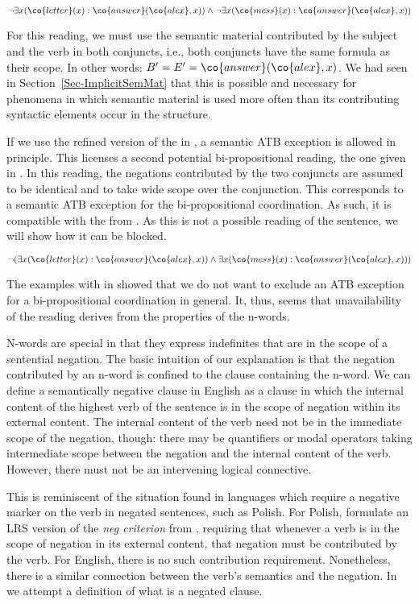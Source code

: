 \documentclass[output=paper]{langsci/langscibook}
\begin{document}
\ea \label{ex-brief-mail-bi}
$\lnot \exists x (\co{letter}(x) : \co{answer}(\co{alex},x))
\land \lnot \exists x (\co{mess}(x) : \co{answer}(\co{alex},x))$
\z 

For this reading, we must use the semantic material contributed by the subject and the verb in both conjuncts, i.e., both conjuncts have the same formula as their scope. 
In other words: $B' = E' = \co{answer}(\co{alex},x)$. We had seen in Section~\ref{Sec-ImplicitSemMat} that this is possible and necessary for phenomena in which semantic material is used more often than its contributing syntactic elements occur in the structure.

If we use the refined version of the \CCB{} in , 
a semantic ATB exception is allowed in principle.
This licenses a second potential bi-propositional reading, the one given in .
In this reading, the negations contributed by the two conjuncts are assumed to be identical and to take wide scope over the conjunction. This corresponds to a semantic ATB exception for the bi-propositional coordination. As such, it is compatible with the \SemATB{} from . 
As this is not a possible reading of the sentence, we will show how it can be blocked.

\ea \label{ex-brief-mail-biWide}
$\lnot (\exists x (\co{letter}(x) : \co{answer}(\co{alex},x))
\land \exists x (\co{mess}(x) : \co{answer}(\co{alex},x)))$
\z 

The examples with  in  showed that we do not want to exclude an ATB exception for a bi-propositional coordination in general. It, thus, seems that unavailability of the reading derives from the properties of the n-words.

N-words are special in that they express indefinites that are in the scope of a sentential negation. 
The basic intuition of our explanation is that the negation contributed by an n-word is confined to the clause containing the n-word. 
We can define a semantically negative clause in English as a clause in which the internal content of the highest verb of the sentence is in the scope of negation within its external content. 
The internal content of the verb need not be in the immediate scope of the negation, though: there may be quantifiers or modal operators taking intermediate scope between the negation and the internal content of the verb. However, there must not be an intervening logical connective.

This is reminiscent of the situation found in languages which require a negative marker on the verb in negated sentences, such as Polish. For Polish, \citet{Richter:Sailer:06} formulate an LRS version of the \emph{neg criterion} from \citet{Haegeman&Zanuttini:96}, requiring that whenever a verb is in the scope of negation in its external content, that negation must be contributed by the verb. 
For English, there is no such contribution requirement. Nonetheless, there is a similar connection between the verb's semantics and the negation.
In  we attempt a definition of what is a negated clause.
\end{document}
